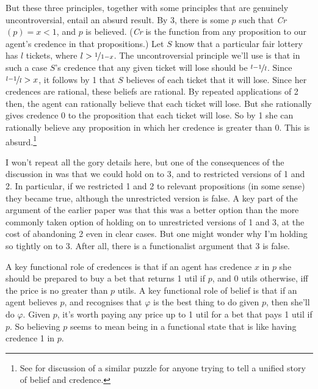 \noindent But these three principles, together with some principles that are genuinely uncontroversial, entail an absurd result. By 3, there is some $p$ such that \textit{Cr}$(p) = x < 1$, and $p$ is believed. (\textit{Cr} is the function from any proposition to our agent's credence in that propositions.) Let $S$ know that a particular fair lottery has $l$ tickets, where $l > \nicefrac{1}{1-x}$. The uncontroversial principle we'll use is that in such a case $S$'s credence that any given ticket will lose should be $\nicefrac{l-1}{l}$. Since $\nicefrac{l-1}{l} > x$, it follows by 1 that $S$ believes of each ticket that it will lose. Since her credences are rational, these beliefs are rational. By repeated applications of 2 then, the agent can rationally believe that each ticket will lose. But she rationally gives credence 0 to the proposition that each ticket will lose. So by 1 she can rationally believe any proposition in which her credence is greater than 0. This is absurd.\footnote{See \cite{Sturgeon2008-STURAT} for discussion of a similar puzzle for anyone trying to tell a unified story of belief and credence.}

I won't repeat all the gory details here, but one of the consequences of the discussion in \cite{Weatherson2005-WEACWD} was that we could hold on to 3, and to restricted versions of 1 and 2. In particular, if we restricted 1 and 2 to relevant propositions (in some sense) they became true, although the unrestricted version is false. A key part of the argument of the earlier paper was that this was a better option than the more commonly taken option of holding on to unrestricted versions of 1 and 3, at the cost of abandoning 2 even in clear cases. But one might wonder why I'm holding so tightly on to 3. After all, there is a functionalist argument that 3 is false.

A key functional role of credences is that if an agent has credence $x$ in $p$ she should be prepared to buy a bet that returns 1 util if $p$, and 0 utils otherwise, iff the price is no greater than $p$ utils. A key functional role of belief is that if an agent believes $p$, and recognises that $\varphi$ is the best thing to do given $p$, then she'll do $\varphi$. Given $p$, it's worth paying any price up to 1 util for a bet that pays 1 util if $p$. So believing $p$ seems to mean being in a functional state that is like having credence 1 in $p$.

